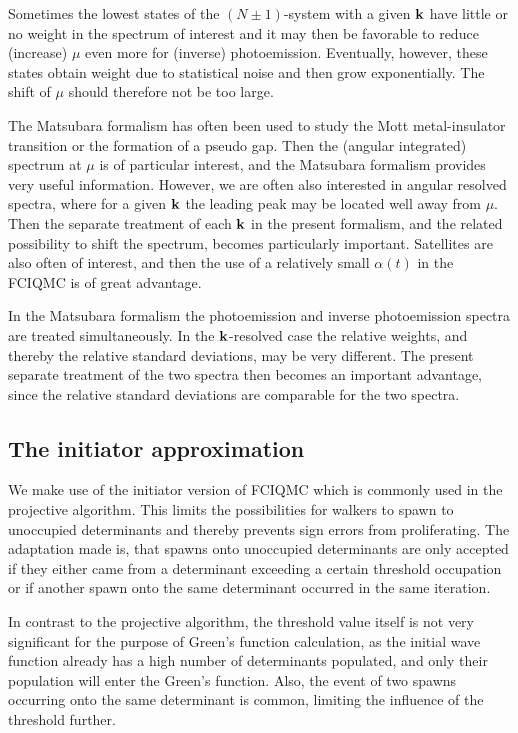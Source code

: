 Sometimes the lowest states of the $(N\pm 1)$-system with a given ${\bf k}$ have 
little or no weight in the spectrum of interest and it may then be favorable to 
reduce (increase) $\mu$ even more for (inverse) photoemission. Eventually, however, 
these states obtain weight due to statistical noise and then grow exponentially. 
The shift of $\mu$ should therefore not be too large.

The Matsubara formalism has often been used to study the Mott metal-insulator 
transition or the formation of a pseudo gap. Then the (angular integrated)
spectrum  at $\mu$ is of particular interest, and the Matsubara formalism 
provides very useful information. However, we are often also interested in angular resolved spectra, where for a given ${\bf k}$ the leading peak may be located
well away from $\mu$. Then the separate treatment of each ${\bf k}$ in the
present formalism, and the related possibility to shift the spectrum,
becomes particularly important. Satellites are also often of interest, 
and then the use of a relatively small $\alpha(t)$ in the FCIQMC is
of great advantage.

In the Matsubara formalism the photoemission and inverse photoemission spectra
are treated simultaneously. In the ${\bf k}$-resolved case the relative weights,
and thereby the relative standard deviations, may be very different. The present
separate treatment of the two spectra then becomes an important advantage, since 
the relative standard deviations are comparable for the two spectra.

\subsection{The initiator approximation}

We make use of the initiator version of FCIQMC \cite{CBA2010, CBA2011} which
is commonly used in the projective algorithm. This limits the possibilities
for walkers to spawn to unoccupied determinants and thereby prevents sign
errors from proliferating. The adaptation made is, that spawns onto
unoccupied determinants are only accepted if they either came from a
determinant exceeding a certain threshold occupation or if another spawn
onto the same determinant occurred in the same iteration. 

In contrast to the projective algorithm, the threshold value itself is not
very significant for the purpose of Green's function calculation, as the initial
wave function already has a high number of determinants populated, and only
their population will enter the Green's function. Also, the event of two
spawns occurring onto the same determinant is common, limiting the influence of
the threshold further. 

